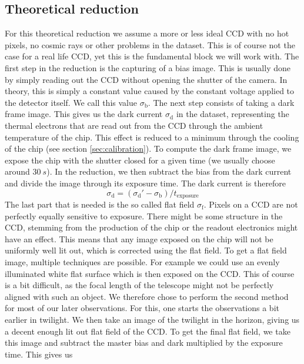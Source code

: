 \documentclass{article}
\begin{document}
\subsection{Theoretical reduction}
For this theoretical reduction we assume a more or less ideal CCD with no hot pixels, no cosmic rays or other problems in the dataset. This is of course not the case for a real life CCD, yet this is the fundamental block we will work with.\newline
The first step in the reduction is the capturing of a bias image. This is usually done by simply reading out the CCD without opening the shutter of the camera. In theory, this is simply a constant value caused by the constant voltage applied to the detector itself. We call this value $\sigma_\text{b}$. The next step consists of taking a dark frame image. This gives us the dark current $\sigma_\text{d}$ in the dataset, representing the thermal electrons that are read out from the CCD through the ambient temperature of the chip. This effect is reduced to a minimum through the cooling of the chip (see section \ref{sec:calibration}). To compute the dark frame image, we expose the chip with the shutter closed for a given time (we usually choose around $\SI{30}{s}$). In the reduction, we then subtract the bias from the dark current and divide the image through its exposure time. The dark current is therefore
\begin{equation}
    \sigma_\text{d} = (\sigma_\text{d}' {-}\sigma_\text{b})/t_\text{exposure}
\end{equation}
The last part that is needed is the so called flat field $\sigma_\text{f}$. Pixels on a CCD are not perfectly equally sensitive to exposure. There might be some structure in the CCD, stemming from the production of the chip or the readout electronics might have an effect. This means that any image exposed on the chip will not be uniformly well lit out, which is corrected using the flat field. To get a flat field image, multiple techniques are possible. For example we could use an evenly illuminated white flat surface which is then exposed on the CCD. This of course is a bit difficult, as the focal length of the telescope might not be perfectly aligned with such an object. We therefore chose to perform the second method for most of our later observations. For this, one starts the observations a bit earlier in twilight. We then take an image of the twilight in the horizon, giving us a decent enough lit out flat field of the CCD. To get the final flat field, we take this image and subtract the master bias and dark multiplied by the exposure time. This gives us
\end{document}
